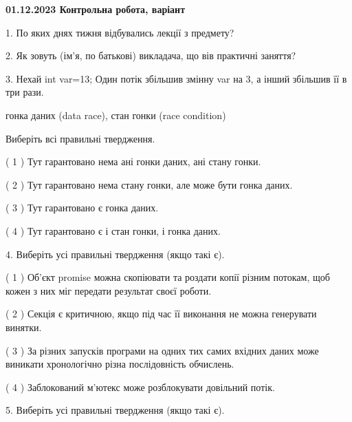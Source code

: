 \documentclass[12pt, ukrainian]{article}
\begin{document}
\vspace{4mm}
\newpage
\begin {large}

\textbf{01.12.2023 Контрольна робота, варіант  }\par


{
1. По яких днях тижня відбувались лекції з предмету?



\vspace{5mm}
2. Як зовуть (ім'я, по батькові) викладача, що вів практичні заняття?



\vspace{5mm}
3. Нехай int var=13; Один потік збільшив змінну var на 3, а інший збільшив її в три рази.

гонка даних (data race), стан гонки (race condition)

Виберіть всі правильні твердження.\par
\vspace{2mm}
( 1 ) Тут гарантовано нема ані гонки даних, ані стану гонки.%

( 2 ) Тут гарантовано нема стану гонки, але може бути гонка даних.%

( 3 ) Тут гарантовано є гонка даних.%

( 4 ) Тут гарантовано є і стан гонки, і гонка даних.%


\vspace{5mm}
4. Виберіть усі правильні твердження (якщо такі є).\par
\vspace{2mm}

( 1 ) Об’єкт promise можна скопіювати та роздати копії різним потокам, щоб кожен з них міг передати результат своєї роботи.%

( 2 ) Секція є критичною, якщо під час її виконання не можна генерувати винятки.%

( 3 ) За різних запусків програми на одних тих самих вхідних даних може виникати хронологічно різна послідовність обчислень.%

( 4 ) Заблокований м’ютекс може розблокувати довільний потік.%


\vspace{5mm}
5. Виберіть усі правильні твердження (якщо такі є).\par
\vspace{2mm}

}
\end{large}
\end{document}
